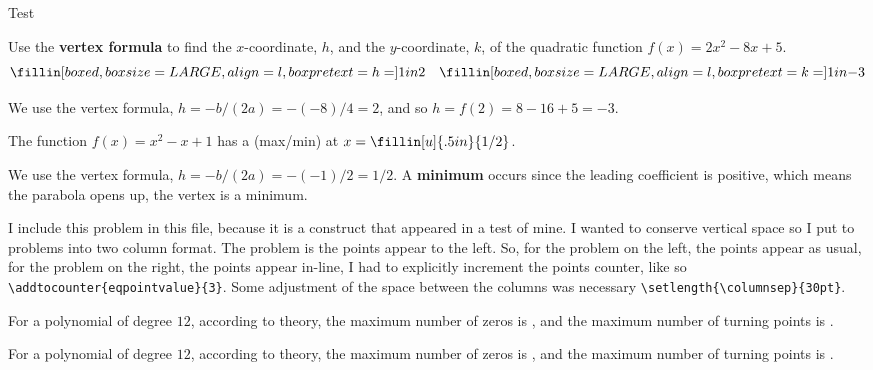 \documentclass{article}
\begin{document}
\begin{exam}{Test\nExam}
\begin{theseproblems}
\setlength{\columnsep}{30pt}

\begin{multicols}{2}
\begin{problem}[5]
Use the \textbf{vertex formula} to find the $x$-coordinate, $h$, and the
$y$-coordinate, $k$, of the quadratic function $ f(x) = 2x^2 - 8x + 5 $.
\begin{equation*}
    \fillin[boxed,boxsize=LARGE,align=l,boxpretext={h=}]{1in}{2}\quad
    \fillin[boxed,boxsize=LARGE,align=l,boxpretext={k=}]{1in}{-3}
\end{equation*}
\begin{solution}[.5in]
We use the vertex formula, $ h = -b/(2a) = - (-8)/4 = 2 $, and
so $h=f(2) = 8 - 16 + 5 = -3$.
\end{solution}
\end{problem}

\columnbreak

\begin{problem}[] %
\addtocounter{eqpointvalue}{3} The function $ f(x) = x^2 - x + 1 $ has a
 (max/min) at $x = \fillin[u]{.5in}{1/2}$.
\begin{solution}[\sameVspace]
We use the vertex formula, $ h = -b/(2a) = - (-1)/2 =
1/2 $. A \textbf{minimum} occurs since the leading coefficient is
positive, which means the parabola opens up, the vertex is a minimum.
\end{solution}
\end{problem}
\end{multicols}

\endgroup

\begin{eqComments}[Comments:]
I include this problem in this file, because it is a construct that
appeared in a test of mine. I wanted to conserve vertical space so I put
to problems into two column format. The problem is the points appear to
the left. So, for the problem on the left, the points appear as usual, for
the problem on the right, the points appear in-line, I had to explicitly
increment the points counter, like so
\verb~\addtocounter{eqpointvalue}{3}~. Some adjustment of the space
between the columns was necessary \verb~\setlength{\columnsep}{30pt}~.
\end{eqComments}

\renameSolnAfterTo{}

\begin{problem}[5]
For a polynomial of degree $12$, according to theory, the maximum number
of zeros is , and the maximum number of turning points
is .
\begin{solution}[]\ifvspacewithsolns
For a polynomial of degree $12$, according to theory, the maximum number
of zeros is , and the maximum number of turning points
is .\fi
\end{solution}
\end{problem}


\end{theseproblems}
\end{exam}
\end{document}
